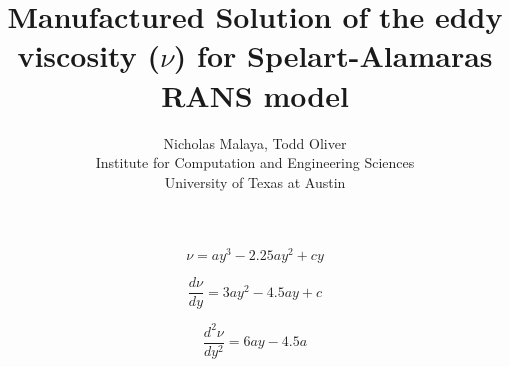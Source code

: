 \documentclass{article}
\title{\bf{Manufactured Solution of the eddy viscosity ($\nu$) for Spelart-Alamaras RANS model}}
\author{Nicholas Malaya, Todd Oliver \\ Institute for Computation and Engineering Sciences \\ University of Texas at Austin} \date{}
\begin{document}
\maketitle

\begin{equation}
  \nu = a y^3 -2.25 a y^2 + cy
\end{equation}

\begin{equation}
  \frac{d\nu}{dy} = 3 a y^2 - 4.5 a y + c
\end{equation}

\begin{equation}
  \frac{d^2 \nu}{dy^2} = 6 a y - 4.5 a
\end{equation}
\end{document}
